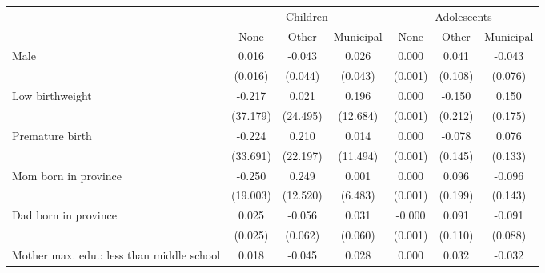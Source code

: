 {
\def\sym#1{\ifmmode^{#1}\else\(^{#1}\)\fi}
\begin{tabular}{l*{6}{c}}
\toprule
&\multicolumn{3}{c}{Children} & \multicolumn{3}{c}{Adolescents} \\
                    &\multicolumn{1}{c}{None}&\multicolumn{1}{c}{Other}&\multicolumn{1}{c}{Municipal}&\multicolumn{1}{c}{None}&\multicolumn{1}{c}{Other}&\multicolumn{1}{c}{Municipal}\\
\midrule
Male                &       0.016         &      -0.043         &       0.026         &       0.000         &       0.041         &      -0.043         \\
                    &     (0.016)         &     (0.044)         &     (0.043)         &     (0.001)         &     (0.108)         &     (0.076)         \\
\addlinespace
Low birthweight     &      -0.217         &       0.021         &       0.196         &       0.000         &      -0.150         &       0.150         \\
                    &    (37.179)         &    (24.495)         &    (12.684)         &     (0.001)         &     (0.212)         &     (0.175)         \\
\addlinespace
Premature birth     &      -0.224         &       0.210         &       0.014         &       0.000         &      -0.078         &       0.076         \\
                    &    (33.691)         &    (22.197)         &    (11.494)         &     (0.001)         &     (0.145)         &     (0.133)         \\
\addlinespace
Mom born in province&      -0.250         &       0.249         &       0.001         &       0.000         &       0.096         &      -0.096         \\
                    &    (19.003)         &    (12.520)         &     (6.483)         &     (0.001)         &     (0.199)         &     (0.143)         \\
\addlinespace
Dad born in province&       0.025         &      -0.056         &       0.031         &      -0.000         &       0.091         &      -0.091         \\
                    &     (0.025)         &     (0.062)         &     (0.060)         &     (0.001)         &     (0.110)         &     (0.088)         \\
\addlinespace
Mother max. edu.: less than middle school&       0.018         &      -0.045         &       0.028         &       0.000         &       0.032         &      -0.032         \\

\end{tabular}}
